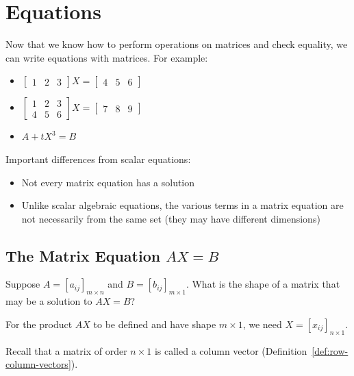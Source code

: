 \section{Equations}
\begin{note}
    Now that we know how to perform operations on matrices and check equality, we can write equations with matrices. For example:
    \begin{itemize}
        \item $\begin{bmatrix} 1 & 2 & 3 \end{bmatrix} X = \begin{bmatrix} 4 & 5 & 6 \end{bmatrix}$
        \item $\begin{bmatrix} 1 & 2 & 3 \\ 4 & 5 & 6 \end{bmatrix} X = \begin{bmatrix} 7 & 8 & 9 \end{bmatrix}$
        \item $A + tX^3 = B$
    \end{itemize}
\end{note}

\begin{note}
    Important differences from scalar equations:
    \begin{itemize}
        \item Not every matrix equation has a solution
        \item Unlike scalar algebraic equations, the various terms in a matrix equation are not necessarily from the same set (they may have different dimensions)
    \end{itemize}
\end{note}

\subsection{The Matrix Equation $AX = B$}

\begin{note}
    Suppose $A = [a_{ij}]_{m \times n}$ and $B = [b_{ij}]_{m \times 1}$. What is the shape of a matrix that may be a solution to $AX = B$?
    
    For the product $AX$ to be defined and have shape $m \times 1$, we need $X = [x_{ij}]_{n \times 1}$.
    
    Recall that a matrix of order $n \times 1$ is called a column vector (Definition~\ref{def:row-column-vectors}).
\end{note}

